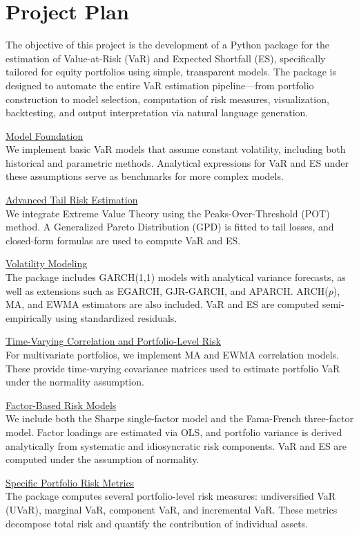 \section*{Project Plan}

\small

The objective of this project is the development of a Python package for the estimation of Value-at-Risk (VaR) and Expected Shortfall (ES), specifically tailored for equity portfolios using simple, transparent models. The package is designed to automate the entire VaR estimation pipeline—from portfolio construction to model selection, computation of risk measures, visualization, backtesting, and output interpretation via natural language generation.

\underline{Model Foundation} \\
We implement basic VaR models that assume constant volatility, including both historical and parametric methods. Analytical expressions for VaR and ES under these assumptions serve as benchmarks for more complex models.

\underline{Advanced Tail Risk Estimation} \\
We integrate Extreme Value Theory using the Peaks-Over-Threshold (POT) method. A Generalized Pareto Distribution (GPD) is fitted to tail losses, and closed-form formulas are used to compute VaR and ES.

\underline{Volatility Modeling} \\
The package includes GARCH(1,1) models with analytical variance forecasts, as well as extensions such as EGARCH, GJR-GARCH, and APARCH. ARCH($p$), MA, and EWMA estimators are also included. VaR and ES are computed semi-empirically using standardized residuals.

\underline{Time-Varying Correlation and Portfolio-Level Risk} \\
For multivariate portfolios, we implement MA and EWMA correlation models. These provide time-varying covariance matrices used to estimate portfolio VaR under the normality assumption.

\underline{Factor-Based Risk Models} \\
We include both the Sharpe single-factor model and the Fama-French three-factor model. Factor loadings are estimated via OLS, and portfolio variance is derived analytically from systematic and idiosyncratic risk components. VaR and ES are computed under the assumption of normality.

\underline{Specific Portfolio Risk Metrics} \\
The package computes several portfolio-level risk measures: undiversified VaR (UVaR), marginal VaR, component VaR, and incremental VaR. These metrics decompose total risk and quantify the contribution of individual assets.

